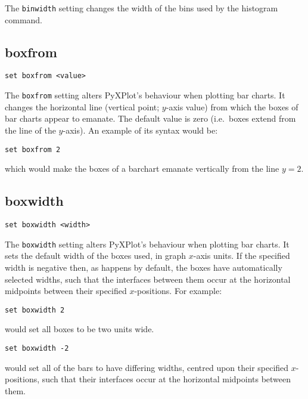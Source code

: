 The {\tt binwidth} setting changes the width of the bins used by the histogram
command.

\subsection{boxfrom}

\begin{verbatim}
set boxfrom <value>
\end{verbatim}

The {\tt boxfrom} setting alters PyXPlot's behaviour when plotting bar charts.
It changes the horizontal line (vertical point; $y$-axis value) from which the
boxes of bar charts appear to emanate.  The default value is zero (i.e.\ boxes
extend from the line of the $y$-axis). An example of its syntax would be:

\begin{verbatim}
set boxfrom 2
\end{verbatim}

\noindent which would make the boxes of a barchart emanate vertically from the line $y=2$.


\subsection{boxwidth}

\begin{verbatim}
set boxwidth <width>
\end{verbatim}

The {\tt boxwidth} setting alters PyXPlot's behaviour when plotting bar charts.
It sets the default width of the boxes used, in graph $x$-axis units.  If the
specified width is negative then, as happens by default, the boxes have
automatically selected widths, such that the interfaces between them occur at
the horizontal midpoints between their specified $x$-positions.  For example:

\begin{verbatim}
set boxwidth 2
\end{verbatim}

\noindent would set all boxes to be two units wide.

\begin{verbatim}
set boxwidth -2
\end{verbatim}

\noindent would set all of the bars to have differing widths, centred upon their
specified $x$-positions, such that their interfaces occur at the horizontal
midpoints between them.


